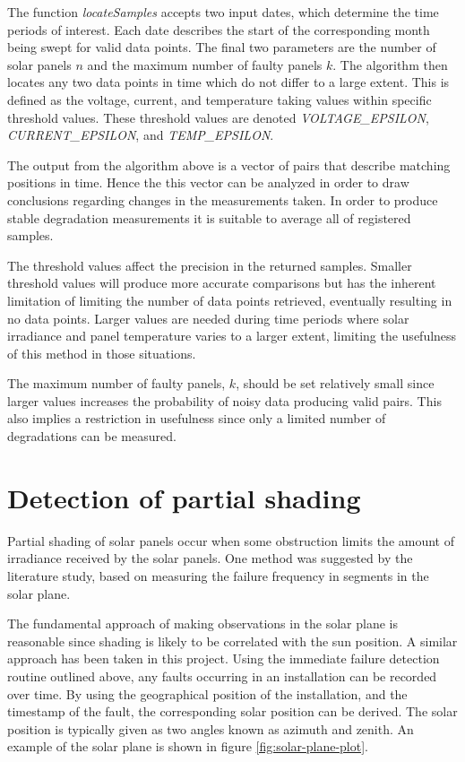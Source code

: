 The function \emph{locateSamples} accepts two input dates, which determine the time periods of interest.
Each date describes the start of the corresponding month being swept for valid data points.
The final two parameters are the number of solar panels $n$ and the maximum number of faulty panels $k$.
The algorithm then locates any two data points in time which do not differ to a large extent.
This is defined as the voltage, current, and temperature taking values within specific threshold values.
These threshold values are denoted \emph{VOLTAGE\_EPSILON}, \emph{CURRENT\_EPSILON}, and \emph{TEMP\_EPSILON}.

The output from the algorithm above is a vector of pairs that describe matching positions in time.
Hence the this vector can be analyzed in order to draw conclusions regarding changes in the measurements taken.
In order to produce stable degradation measurements it is suitable to average all of registered samples.

The threshold values affect the precision in the returned samples.
Smaller threshold values will produce more accurate comparisons but has the inherent limitation of limiting the number of data points retrieved, eventually resulting in no data points.
Larger values are needed during time periods where solar irradiance and panel temperature varies to a larger extent, limiting the usefulness of this method in those situations.

The maximum number of faulty panels, $k$, should be set relatively small since larger values increases the probability of noisy data producing valid pairs.
This also implies a restriction in usefulness since only a limited number of degradations can be measured.

\section{Detection of partial shading}
Partial shading of solar panels occur when some obstruction limits the amount of irradiance received by the solar panels.
One method was suggested by the literature study, based on measuring the failure frequency in segments in the solar plane.

The fundamental approach of making observations in the solar plane is reasonable since shading is likely to be correlated with the sun position.
A similar approach has been taken in this project.
Using the immediate failure detection routine outlined above, any faults occurring in an installation can be recorded over time.
By using the geographical position of the installation, and the timestamp of the fault, the corresponding solar position can be derived.
The solar position is typically given as two angles known as azimuth and zenith.
An example of the solar plane is shown in figure \ref{fig:solar-plane-plot}.

